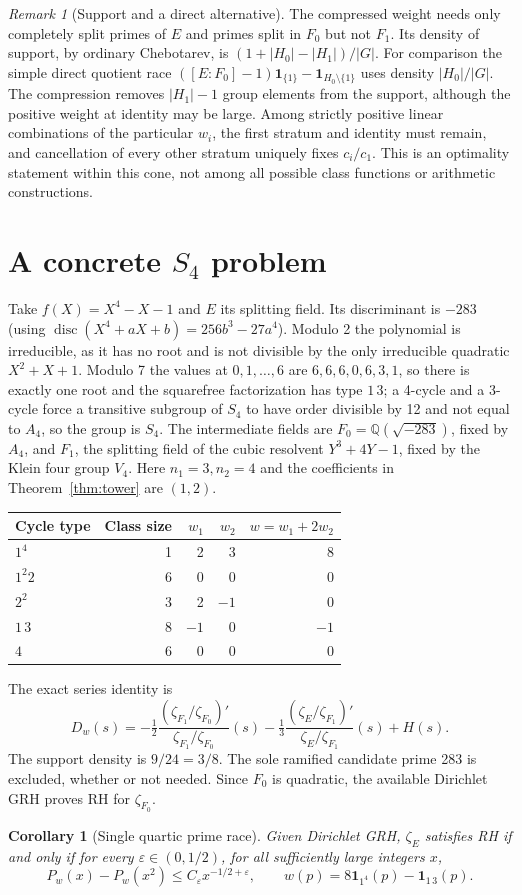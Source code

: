 \documentclass[11pt]{article}
\newtheorem{corollary}[theorem]{Corollary}
\theoremstyle{remark}\newtheorem{remark}[theorem]{Remark}
\newcommand{\Q}{\mathbb Q}\newcommand{\C}{\mathbb C}\newcommand{\R}{\mathbb R}\newcommand{\ind}{\mathbf 1}\newcommand{\ord}{\operatorname{ord}}\newcommand{\Rea}{\operatorname{Re}}
\begin{document}
\begin{remark}[Support and a direct alternative]
The compressed weight needs only completely split primes of $E$ and primes split in $F_0$ but not $F_1$. Its density of support, by ordinary Chebotarev, is $(1+|H_0|-|H_1|)/|G|$. For comparison the simple direct quotient race $([E:F_0]-1)\ind_{\{1\}}-\ind_{H_0\setminus\{1\}}$ uses density $|H_0|/|G|$. The compression removes $|H_1|-1$ group elements from the support, although the positive weight at identity may be large. Among strictly positive linear combinations of the particular $w_i$, the first stratum and identity must remain, and cancellation of every other stratum uniquely fixes $c_i/c_1$. This is an optimality statement within this cone, not among all possible class functions or arithmetic constructions.
\end{remark}

\section{A concrete $S_4$ problem}
Take $f(X)=X^4-X-1$ and $E$ its splitting field. Its discriminant is $-283$ (using $\operatorname{disc}(X^4+aX+b)=256b^3-27a^4$). Modulo 2 the polynomial is irreducible, as it has no root and is not divisible by the only irreducible quadratic $X^2+X+1$. Modulo 7 the values at $0,1,\ldots,6$ are $6,6,6,0,6,3,1$, so there is exactly one root and the squarefree factorization has type $1\,3$; a 4-cycle and a 3-cycle force a transitive subgroup of $S_4$ to have order divisible by 12 and not equal to $A_4$, so the group is $S_4$. The intermediate fields are $F_0=\Q(\sqrt{-283})$, fixed by $A_4$, and $F_1$, the splitting field of the cubic resolvent $Y^3+4Y-1$, fixed by the Klein four group $V_4$. Here $n_1=3,n_2=4$ and the coefficients in Theorem~\ref{thm:tower} are $(1,2)$.
\begin{center}
\begin{tabular}{@{}lrrr r@{}}
\toprule
Cycle type & Class size & $w_1$ & $w_2$ & $w=w_1+2w_2$\\\midrule
$1^4$ & 1 & 2 & 3 & 8\\
$1^2 2$ & 6 & 0 & 0 & 0\\
$2^2$ & 3 & 2 & $-1$ & 0\\
$1\,3$ & 8 & $-1$ & 0 & $-1$\\
$4$ & 6 & 0 & 0 & 0\\\bottomrule
\end{tabular}
\end{center}
The exact series identity is
\[
 D_w(s)=-\tfrac12\frac{(\zeta_{F_1}/\zeta_{F_0})'}{\zeta_{F_1}/\zeta_{F_0}}(s)
        -\tfrac13\frac{(\zeta_E/\zeta_{F_1})'}{\zeta_E/\zeta_{F_1}}(s)+H(s).
\]
The support density is $9/24=3/8$. The sole ramified candidate prime 283 is excluded, whether or not needed. Since $F_0$ is quadratic, the available Dirichlet GRH proves RH for $\zeta_{F_0}$.
\begin{corollary}[Single quartic prime race]
Given Dirichlet GRH, $\zeta_E$ satisfies RH if and only if for every $\varepsilon\in(0,1/2)$, for all sufficiently large integers $x$,
\[
P_w(x)-P_w(x^2)\le C_\varepsilon x^{-1/2+\varepsilon},
\qquad w(p)=8\ind_{1^4}(p)-\ind_{1\,3}(p).
\]
\end{corollary}
\end{document}
